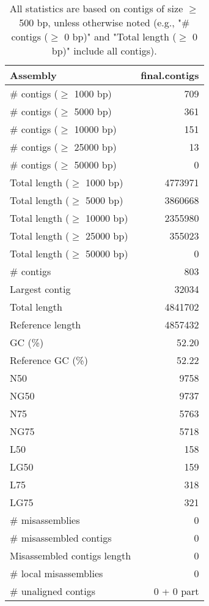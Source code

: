 \documentclass[12pt,a4paper]{article}
\begin{document}
\begin{table}[ht]
\begin{center}
\caption{All statistics are based on contigs of size $\geq$ 500 bp, unless otherwise noted (e.g., "\# contigs ($\geq$ 0 bp)" and "Total length ($\geq$ 0 bp)" include all contigs).}
\begin{tabular}{|l*{1}{|r}|}
\hline
Assembly & final.contigs \\ \hline
\# contigs ($\geq$ 1000 bp) & 709 \\ \hline
\# contigs ($\geq$ 5000 bp) & 361 \\ \hline
\# contigs ($\geq$ 10000 bp) & 151 \\ \hline
\# contigs ($\geq$ 25000 bp) & 13 \\ \hline
\# contigs ($\geq$ 50000 bp) & 0 \\ \hline
Total length ($\geq$ 1000 bp) & 4773971 \\ \hline
Total length ($\geq$ 5000 bp) & 3860668 \\ \hline
Total length ($\geq$ 10000 bp) & 2355980 \\ \hline
Total length ($\geq$ 25000 bp) & 355023 \\ \hline
Total length ($\geq$ 50000 bp) & 0 \\ \hline
\# contigs & 803 \\ \hline
Largest contig & 32034 \\ \hline
Total length & 4841702 \\ \hline
Reference length & 4857432 \\ \hline
GC (\%) & 52.20 \\ \hline
Reference GC (\%) & 52.22 \\ \hline
N50 & 9758 \\ \hline
NG50 & 9737 \\ \hline
N75 & 5763 \\ \hline
NG75 & 5718 \\ \hline
L50 & 158 \\ \hline
LG50 & 159 \\ \hline
L75 & 318 \\ \hline
LG75 & 321 \\ \hline
\# misassemblies & 0 \\ \hline
\# misassembled contigs & 0 \\ \hline
Misassembled contigs length & 0 \\ \hline
\# local misassemblies & 0 \\ \hline
\# unaligned contigs & 0 + 0 part \\ \hline

\end{tabular}
\end{center}
\end{table}
\end{document}
